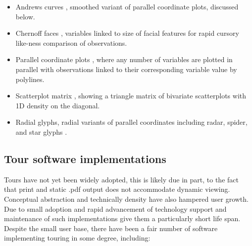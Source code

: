 \documentclass{monashthesis}
\begin{document}
\begin{itemize}
  \begin{itemize}
  \tightlist
  \item
    Andrews curves \autocite{andrews_plots_1972}, smoothed variant of
    parallel coordinate plots, discussed below.
  \item
    Chernoff faces \autocite{chernoff_use_1973}, variables linked to
    size of facial features for rapid cursory like-ness comparison of
    observations.
  \item
    Parallel coordinate plots \autocite{ocagne_coordonnees_1885}, where
    any number of variables are plotted in parallel with observations
    linked to their corresponding variable value by polylines.
  \item
    Scatterplot matrix \autocite{becker_brushing_1987}, showing a
    triangle matrix of bivariate scatterplots with 1D density on the
    diagonal.
  \item
    Radial glyphs, radial variants of parallel coordinates including
    radar, spider, and star glyphs \autocite{siegel_surgical_1972}.
  \end{itemize}
\end{itemize}

\subsection{Tour software
implementations}\label{tour-software-implementations}

Tours have not yet been widely adopted, this is likely due in part, to
the fact that print and static .pdf output does not accommodate dynamic
viewing. Conceptual abstraction and technically density have also
hampered user growth. Due to small adoption and rapid advancement of
technology support and maintenance of such implementations give them a
particularly short life span. Despite the small user base, there have
been a fair number of software implementing touring in some degree,
including:
\end{document}
